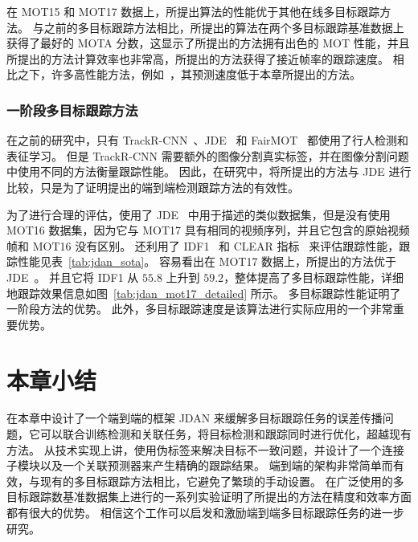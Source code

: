在 MOT15 和 MOT17 数据上，所提出算法的性能优于其他在线多目标跟踪方法。
与之前的多目标跟踪方法相比，所提出的算法在两个多目标跟踪基准数据上获得了最好的 MOTA 分数，这显示了所提出的方法拥有出色的 MOT 性能，并且所提出的方法计算效率也非常高，所提出的方法获得了接近帧率的跟踪速度。
相比之下，许多高性能方法，例如~\cite{fang2018recurrent,poi}，其预测速度低于本章所提出的方法。


\subsubsection{一阶段多目标跟踪方法}
在之前的研究中，只有 TrackR-CNN~\cite{voigtlaender2019mots}、JDE~\cite{jde} 和 FairMOT~\cite{fairmot} 都使用了行人检测和表征学习。
但是 TrackR-CNN 需要额外的图像分割真实标签，并在图像分割问题中使用不同的方法衡量跟踪性能。
因此，在研究中，将所提出的方法与 JDE 进行比较，只是为了证明提出的端到端检测跟踪方法的有效性。

为了进行合理的评估，使用了 JDE~\cite{jde} 中用于描述的类似数据集，但是没有使用 MOT16 数据集，因为它与 MOT17 具有相同的视频序列，并且它包含的原始视频帧和 MOT16 没有区别。
还利用了 IDF1~\cite{ristani2016performance} 和 CLEAR 指标~\cite{bernardin2008evaluating} 来评估跟踪性能，跟踪性能见表~\ref{tab:jdan_sota}。
容易看出在 MOT17 数据上，所提出的方法优于 JDE~\cite{jde}。
并且它将 IDF1 从 $55.8$ 上升到 $59.2$，整体提高了多目标跟踪性能，详细地跟踪效果信息如图~\ref{tab:jdan_mot17_detailed} 所示。
多目标跟踪性能证明了一阶段方法的优势。
此外，多目标跟踪速度是该算法进行实际应用的一个非常重要优势。



\section{本章小结}
在本章中设计了一个端到端的框架 JDAN 来缓解多目标跟踪任务的误差传播问题，它可以联合训练检测和关联任务，将目标检测和跟踪同时进行优化，超越现有方法。
从技术实现上讲，使用伪标签来解决目标不一致问题，并设计了一个{连接子模块}以及一个{关联预测器}来产生精确的跟踪结果。
{端到端}的架构非常简单而有效，与现有的多目标跟踪方法相比，它避免了繁琐的手动设置。
在广泛使用的多目标跟踪数基准数据集上进行的一系列实验证明了所提出的方法在精度和效率方面都有很大的优势。
相信这个工作可以启发和激励端到端多目标跟踪任务的进一步研究。

